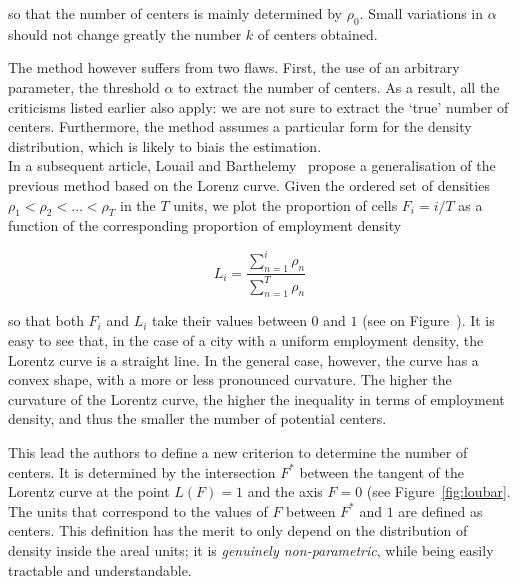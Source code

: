so that the number of centers is mainly determined by $\rho_0$. Small variations
in $\alpha$ should not change greatly the number $k$ of centers obtained.

The method however suffers from two flaws. First, the use of an arbitrary
parameter, the threshold $\alpha$ to extract the number of centers. As a result,
all the criticisms listed earlier also apply: we are not sure to extract the
`true' number of centers. Furthermore, the method assumes a particular form for
the density distribution, which is likely to biais the estimation.\\

In a subsequent article, Louail and Barthelemy~\cite{Louail:2014} propose a
generalisation of the previous method based on the Lorenz curve.  Given the ordered set of
densities $\rho_1 < \rho_2 < \dots < \rho_T$ in the $T$ units, we plot the
proportion of cells $F_i=i/T$ as a function of the corresponding proportion of
employment density

\begin{equation}
    L_i = \frac{\sum_{n=1}^i \rho_n}{\sum_{n=1}^T \rho_n}
\end{equation}

so that both $F_i$ and $L_i$ take their values between $0$ and $1$ (see on
Figure~\cite{fig:loubar}). It is easy
to see that, in the case of a city with a uniform employment density, the
Lorentz curve is a straight line. In the general case, however, the curve has a
convex shape, with a more or less pronounced curvature.  The higher the
curvature of the Lorentz curve, the higher the inequality in terms of employment
density, and thus the smaller the number of potential centers. 

This lead the authors to define a new criterion to determine the number of
centers. It is determined by the intersection $F^*$ between the tangent of the
Lorentz curve at the point $L(F) = 1$ and the axis $F=0$ (see
Figure~\ref{fig:loubar}. The units that correspond to the values of $F$ between
$F^*$ and $1$ are defined as centers. This definition has the merit to only
depend on the distribution of density inside the areal units; it is \emph{genuinely
non-parametric}, while being easily tractable and understandable.\\

